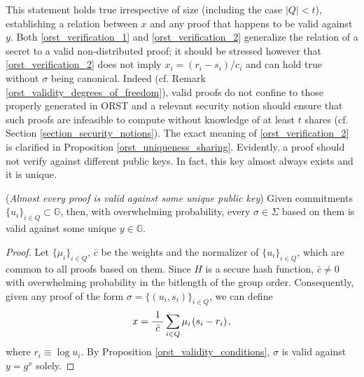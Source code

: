 \documentclass{iacrtrans}
\begin{document}
\noindent
This statement holds true irrespective of size
(including the case $|Q| < t$),
establishing a relation between $x$ and any proof
that happens to be valid against $y$.
Both \eqref{orst_verification_1} and \eqref{orst_verification_2}
generalize the relation of a secret to a
valid non-distributed proof;
it should be stressed however that
\eqref{orst_verification_2} does not imply
$x_i = (r_i - s_i)/c_i$ and
can hold true without $\sigma$ being canonical.
Indeed (cf. Remark \ref{orst_validity_degrees_of_freedom}),
valid proofs do not confine to those properly
generated in \textsf{ORST} and a relevant security notion
should ensure that such proofs are infeasible to compute
without knowledge of at least $t$ shares
(cf. Section \ref{section_security_notions}).
The exact meaning of \eqref{orst_verification_2}
is clarified in Proposition \ref{orst_uniqueness_sharing}.
Evidently, a proof should not verify against
different public keys.
In fact, this key almost always exists and it is unique.

\begin{prop}\label{orst_uniqueness_public_key}
\textup{(\textit{Almost every proof is valid against
some unique public key})}
Given commitments $\{u_i\}_{i \in Q} \subset \mathbb{G}$,
then, with overwhelming probability,
every $\sigma \in \Sigma$ based on them
is valid against some unique $y \in \mathbb{G}$.
\end{prop}

\begin{proof}
Let $\{\mu_i\}_{i \in Q}$, $\bar{c}$
be the weights and the normalizer of $\{u_i\}_{i \in Q}$,
which are common to all proofs based on them.
Since $H$ is a secure hash function,
$\bar{c} \neq 0$ with overwhelming probability in
the bitlength of the group order.
Consequently, given any proof of the form
$\sigma = \{(u_i, s_i)\}_{i \in Q}$, we can define
\vspace{5pt}
\begin{equation*}
x = \frac{1}{\ \bar{c}\ }
\sum_{i \in Q} \mu_i\hspace{1pt}(s_i - r_i)\hspace{1pt},
\vspace{5pt}
\end{equation*}
where $r_i \equiv \log u_i$.
By Proposition \ref{orst_validity_conditions},
$\sigma$ is valid against $y = g ^ x$ solely.
\vspace{5pt}
\end{proof}
\end{document}
